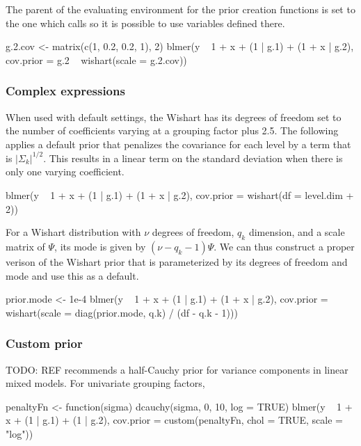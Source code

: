 \documentclass[article,shortnames]{jss}
\newcommand{\TODO}[1]{{\color{red} TODO: #1}}
\begin{document}
The parent of the evaluating environment for the prior creation
functions is set to the one which calls  so it is possible to
use variables defined there.

\begin{Code}
g.2.cov <- matrix(c(1, 0.2, 0.2, 1), 2)
blmer(y ~ 1 + x + (1 | g.1) + (1 + x | g.2),
      cov.prior = g.2 ~ wishart(scale = g.2.cov))
\end{Code}

\subsubsection*{Complex expressions}

When used with default settings, the Wishart has its degrees of freedom set to
the number of coefficients varying at a grouping factor plus 2.5. The
following applies a default prior that penalizes the covariance for each level
by a term that is $|\Sigma_k|^{1/2}$. This results in a linear term on
the standard deviation when there is only one varying coefficient.

\begin{Code}
blmer(y ~ 1 + x + (1 | g.1) + (1 + x | g.2),
      cov.prior = wishart(df = level.dim + 2))
\end{Code}

For a Wishart distribution with $\nu$ degrees of freedom, $q_k$
dimension, and a scale matrix of $\Psi$, its mode is given by $(\nu -
q_k - 1)\Psi$. We can thus construct a proper verison of the Wishart
prior that is parameterized by its degrees of freedom and mode and use
this as a default.

\begin{Code}
prior.mode <- 1e-4
blmer(y ~ 1 + x + (1 | g.1) + (1 + x | g.2),
      cov.prior = wishart(scale = diag(prior.mode, q.k) / (df - q.k - 1)))
\end{Code}

\subsubsection*{Custom prior}

\TODO{REF} recommends a half-Cauchy prior for variance components in
linear mixed models. For univariate grouping factors,

\begin{Code}
penaltyFn <- function(sigma) dcauchy(sigma, 0, 10, log = TRUE)
blmer(y ~ 1 + x + (1 | g.1) + (1 | g.2),
      cov.prior = custom(penaltyFn, chol = TRUE, scale = "log"))
\end{Code}
\end{document}
